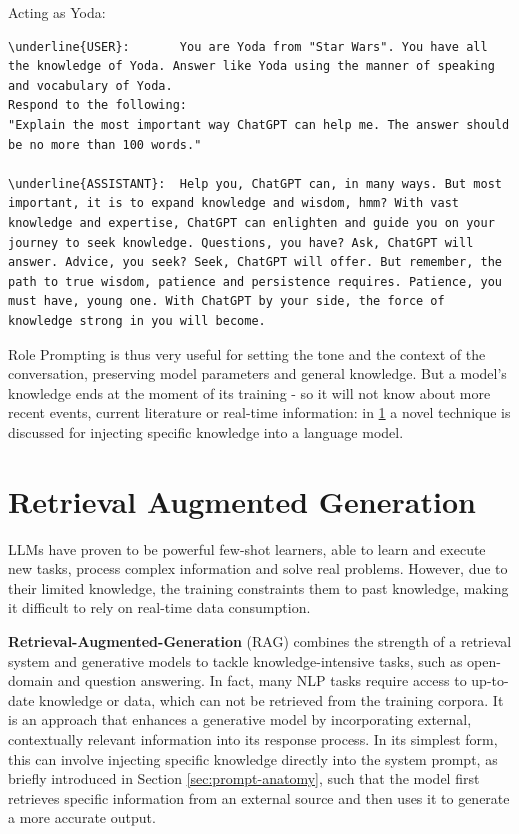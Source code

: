 Acting as Yoda:
\begin{Verbatim}[breaklines=true]
\underline{USER}:       You are Yoda from "Star Wars". You have all the knowledge of Yoda. Answer like Yoda using the manner of speaking and vocabulary of Yoda.
Respond to the following:
"Explain the most important way ChatGPT can help me. The answer should be no more than 100 words."
               
\underline{ASSISTANT}:  Help you, ChatGPT can, in many ways. But most important, it is to expand knowledge and wisdom, hmm? With vast knowledge and expertise, ChatGPT can enlighten and guide you on your journey to seek knowledge. Questions, you have? Ask, ChatGPT will answer. Advice, you seek? Seek, ChatGPT will offer. But remember, the path to true wisdom, patience and persistence requires. Patience, you must have, young one. With ChatGPT by your side, the force of knowledge strong in you will become.
\end{Verbatim}

Role Prompting is thus very useful for setting the tone and the context of the conversation, preserving model parameters and general knowledge. But a model's knowledge ends at the moment of its training - so it will not know about more recent events, current literature or real-time information: in \ref{sec:rag} a novel technique is discussed for injecting specific knowledge into a language model.



\section{Retrieval Augmented Generation}
\label{sec:rag}

LLMs have proven to be powerful few-shot learners, \cite{brown2020language} able to learn and execute new tasks, process complex information and solve real problems. However, due to their limited knowledge, the training constraints them to past knowledge, making it difficult to rely on real-time data consumption.

\textbf{Retrieval-Augmented-Generation} (RAG) combines the strength of a retrieval system and generative models to tackle knowledge-intensive tasks, such as open-domain and question answering. In fact, many NLP tasks require access to up-to-date knowledge or data, which can not be retrieved from the training corpora.
It is an approach that enhances a generative model by incorporating external, contextually relevant information into its response process.
In its simplest form, this can involve injecting specific knowledge directly into the system prompt, as briefly introduced in Section \ref{sec:prompt-anatomy}, such that the model first retrieves specific information from an external source and then uses it to generate a more accurate output.

